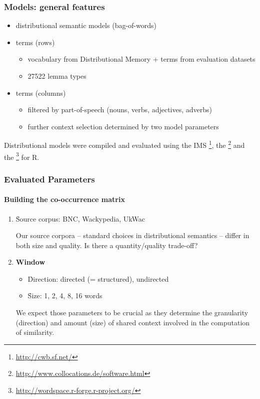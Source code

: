 \documentclass[t]{beamer} %
\begin{document}
\begin{frame}
  \frametitle{Models: general features}
  \begin{itemize}
  \item {} distributional semantic models (bag-of-words)
  \item {} terms (rows)
    \begin{itemize}
    \item vocabulary from Distributional Memory \citep{Baroni:Lenci:10} + terms from evaluation datasets
    \item 27522 lemma types 
    \end{itemize} 
  \item {} terms (columns)
    \begin{itemize}
    \item filtered by part-of-speech (nouns, verbs, adjectives, adverbs)
    \item further context selection determined by two model parameters
    \end{itemize}
  \end{itemize}

  \begin{block}{}\footnotesize
    Distributional models were compiled and evaluated using the IMS \footnote{\scriptsize\url{http://cwb.sf.net/}}, the \footnote{\scriptsize\url{http://www.collocations.de/software.html}} and the \footnote{\scriptsize\url{http://wordspace.r-forge.r-project.org/}} for R.
  \end{block}

\end{frame}

\begin{frame}
  \frametitle{Evaluated Parameters}
  \framesubtitle{Building the co-occurrence matrix}
  \begin{enumerate}
  \item   \h{Source corpus}: BNC, Wackypedia, UkWac
    \begin{block}{}\small
      Our source corpora -- standard choices in distributional semantics -- differ in both size and quality. Is there a quantity/quality trade-off?
    \end{block}
    
  \item  \textbf{Window}
    \begin{itemize}
    \item  \h{Direction}: directed (= structured), undirected
    \item  \h{Size}: 1, 2, 4, 8, 16 words
    \end{itemize}   
    
    \begin{block}{}\small
      We expect those parameters to be crucial as they determine the granularity (direction) and amount (size) of shared context involved in the computation of similarity.  
    \end{block}          
    
    
  \end{enumerate}   
\end{frame}
\end{document}
